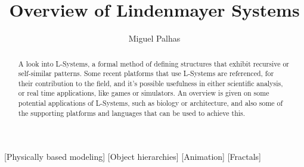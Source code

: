 \documentclass{acmtog}
\begin{document}

\title{Overview of Lindenmayer Systems} %

\author{Miguel Palhas
}

[Physically based modeling]
[Object hierarchies]
[Animation]
[Fractals]




\maketitle

%

\begin{abstract}
A look into L-Systems, a formal method of defining structures that exhibit recursive or self-similar patterns. Some recent platforms that use L-Systems are referenced, for their contribution to the field, and it's possible usefulness in either scientific analysis, or real time applications, like games or simulators. An overview is given on some potential applications of L-Systems, such as biology or architecture, and also some of the supporting platforms and languages that can be used to achieve this.
\end{abstract}
\end{document}
